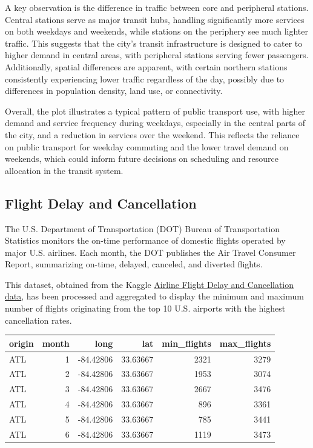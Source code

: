 A key observation is the difference in traffic between core and peripheral stations. Central stations serve as major transit hubs, handling significantly more services on both weekdays and weekends, while stations on the periphery see much lighter traffic. This suggests that the city's transit infrastructure is designed to cater to higher demand in central areas, with peripheral stations serving fewer passengers. Additionally, spatial differences are apparent, with certain northern stations consistently experiencing lower traffic regardless of the day, possibly due to differences in population density, land use, or connectivity.

Overall, the plot illustrates a typical pattern of public transport use, with higher demand and service frequency during weekdays, especially in the central parts of the city, and a reduction in services over the weekend. This reflects the reliance on public transport for weekday commuting and the lower travel demand on weekends, which could inform future decisions on scheduling and resource allocation in the transit system.

\hypertarget{flight-delay-and-cancellation}{%
\subsection{Flight Delay and Cancellation}\label{flight-delay-and-cancellation}}

The U.S. Department of Transportation (DOT) Bureau of Transportation Statistics monitors the on-time performance of domestic flights operated by major U.S. airlines. Each month, the DOT publishes the Air Travel Consumer Report, summarizing on-time, delayed, canceled, and diverted flights.

This dataset, obtained from the Kaggle \href{https://www.kaggle.com/datasets/patrickzel/flight-delay-and-cancellation-dataset-2019-2023}{Airline Flight Delay and Cancellation data}, has been processed and aggregated to display the minimum and maximum number of flights originating from the top 10 U.S. airports with the highest cancellation rates.

\begin{table}
\centering
\begin{tabular}{l|r|r|r|r|r}
\hline
origin & month & long & lat & min\_flights & max\_flights\\
\hline
ATL & 1 & -84.42806 & 33.63667 & 2321 & 3279\\
\hline
ATL & 2 & -84.42806 & 33.63667 & 1953 & 3074\\
\hline
ATL & 3 & -84.42806 & 33.63667 & 2667 & 3476\\
\hline
ATL & 4 & -84.42806 & 33.63667 & 896 & 3361\\
\hline
ATL & 5 & -84.42806 & 33.63667 & 785 & 3441\\
\hline
ATL & 6 & -84.42806 & 33.63667 & 1119 & 3473\\
\hline
\end{tabular}
\end{table}


